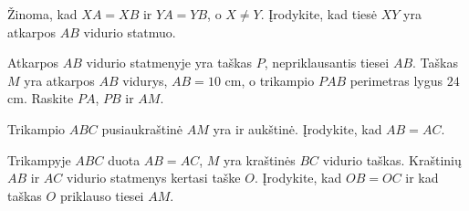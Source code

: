 \documentclass[12pt,a4paper,reqno]{amsart}
\theoremstyle{plain}\newtheorem{theorem}{Teorema}[section]
\theoremstyle{definition}
\theoremstyle{remark}\newtheorem{remark}[theorem]{Pastaba}\newtheorem*{remark*}{Pastaba}
\theoremstyle{definition}\newtheorem*{problem*}{Uždavinys}
\newenvironment{starproblem}{\begingroup\let\numberwithoutstar\thetheorem\renewcommand{\thetheorem}{\numberwithoutstar\textsuperscript{*}}\begin{problem}}{\end{problem}\endgroup}
\begin{document}
\begin{problem}\label{uzd:vidurio-atvirkstine-01} Žinoma, kad $XA=XB$ ir $YA=YB$, o $X\ne Y$. Įrodykite, kad tiesė $XY$ yra atkarpos $AB$ vidurio statmuo. \end{problem}
\begin{problem}\label{uzd:vidurio-taikymas-01} Atkarpos $AB$ vidurio statmenyje yra taškas $P$, nepriklausantis tiesei $AB$. Taškas $M$ yra atkarpos $AB$ vidurys, $AB=10$ cm, o trikampio $PAB$ perimetras lygus $24$ cm. Raskite $PA$, $PB$ ir $AM$. \end{problem}
\begin{problem}\label{uzd:vidurio-taikymas-02} Trikampio $ABC$ pusiaukraštinė $AM$ yra ir aukštinė. Įrodykite, kad $AB=AC$. \end{problem}
\begin{starproblem}\label{uzd:vidurio-taikymas-03} Trikampyje $ABC$ duota $AB=AC$, $M$ yra kraštinės $BC$ vidurio taškas. Kraštinių $AB$ ir $AC$ vidurio statmenys kertasi taške $O$. Įrodykite, kad $OB=OC$ ir kad taškas $O$ priklauso tiesei $AM$. \end{starproblem}
\end{document}

